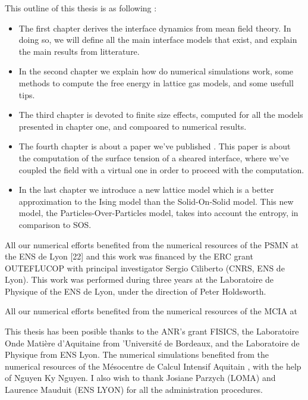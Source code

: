 {This outline of this thesis is as following :
\begin{itemize}
    \item The first chapter derives the interface dynamics from mean field theory. In doing so, we will define all the main interface models that exist, and explain the main results from litterature. 
    \item In the second chapter we explain how do numerical simulations work, some methods to compute the free energy in lattice gas models, and some usefull tips.
    \item The third chapter is devoted to finite size effects, computed for all the models presented in chapter one, and compoared to numerical results. 
    \item The fourth chapter is about a paper we've published \cite{dean_effect_2020}. This paper is about the computation of the surface tension of a sheared interface, where we've coupled the field with a virtual one in order to proceed with the computation.
    \item In the last chapter we introduce a new lattice model which is a better approximation to the Ising model than the Solid-On-Solid model. This new model, the Particles-Over-Particles model, takes into account the entropy, in comparison to SOS.
\end{itemize}

All our numerical efforts benefited from the numerical resources of the PSMN at the ENS
de Lyon [22] and this work was financed by the ERC grant OUTEFLUCOP with principal
investigator Sergio Ciliberto (CNRS, ENS de Lyon). This work was performed during three years
at the Laboratoire de Physique of the ENS de Lyon, under the direction of Peter Holdsworth.



All our numerical efforts benefited from the numerical resources of the MCIA at 

This thesis has been posible thanks to the ANR's grant FISICS, the Laboratoire Onde Matière d'Aquitaine from 'Université de Bordeaux, and the Laboratoire de Physique  from ENS Lyon. The numerical simulations benefited from the numerical resources of the Mésocentre de Calcul Intensif Aquitain \cite{noauthor_mesocentre_nodate}, with the help of Nguyen Ky Nguyen. I also wish to thank Josiane Parzych (LOMA) and Laurence Mauduit (ENS LYON) for all the administration procedures.
}